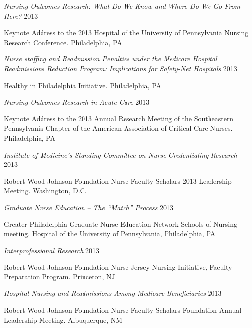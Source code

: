 \documentclass[10pt,]{article}
\begin{document}
{{{{{{{{{{{{{{\begin{hangparas}{.5in}{1}
{\textit {Nursing Outcomes Research: What Do We Know and Where Do We Go From Here?}} \hfill 2013 
\vspace{-2.5mm}
\begin{adjustwidth}{0.5cm}{1cm}
Keynote Address to the 2013 Hospital of the University of Pennsylvania Nursing Research Conference. Philadelphia, PA
\end{adjustwidth}

{\textit {Nurse staffing and Readmission Penalties under the Medicare Hospital Readmissions Reduction Program: Implications for Safety-Net Hospitals}} \hfill 2013 
\vspace{-2.5mm}
\begin{adjustwidth}{0.5cm}{1cm}
Healthy in Philadelphia Initiative. Philadelphia, PA
\end{adjustwidth}

{\textit {Nursing Outcomes Research in Acute Care}} \hfill 2013 
\vspace{-2.5mm}
\begin{adjustwidth}{0.5cm}{1cm}
Keynote Address to the 2013 Annual Research Meeting of the Southeastern Pennsylvania Chapter of the American Association of Critical Care Nurses. Philadelphia, PA
\end{adjustwidth}

{\textit {Institute of Medicine’s Standing Committee on Nurse Credentialing Research}} \hfill 2013 
\vspace{-2.5mm}
\begin{adjustwidth}{0.5cm}{1cm}
Robert Wood Johnson Foundation Nurse Faculty Scholars 2013 Leadership Meeting. Washington, D.C.
\end{adjustwidth}

{\textit {Graduate Nurse Education – The “Match” Process}} \hfill 2013 
\vspace{-2.5mm}
\begin{adjustwidth}{0.5cm}{1cm}
Greater Philadelphia Graduate Nurse Education Network Schools of Nursing meeting. Hospital of the University of Pennsylvania, Philadelphia, PA
\end{adjustwidth}

{\textit {Interprofessional Research}} \hfill 2013 
\vspace{-2.5mm}
\begin{adjustwidth}{0.5cm}{1cm}
Robert Wood Johnson Foundation Nurse Jersey Nursing Initiative, Faculty Preparation Program. Princeton, NJ
\end{adjustwidth}

{\textit {Hospital Nursing and Readmissions Among Medicare Beneficiaries}} \hfill 2013 
\vspace{-2.5mm}
\begin{adjustwidth}{0.5cm}{1cm}
Robert Wood Johnson Foundation Nurse Faculty Scholars Foundation Annual Leadership Meeting. Albuquerque, NM
\end{adjustwidth}


\end{hangparas}}}}}}}}}}}}}}}
\end{document}
